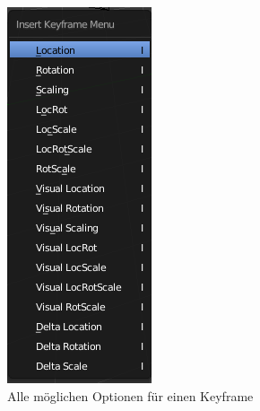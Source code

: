 \begin{figure}[H]
    \includegraphics[width=.8\textwidth]{images/animation_keyframes_options.PNG}
    \caption{Alle möglichen Optionen für einen Keyframe}
\end{figure}

